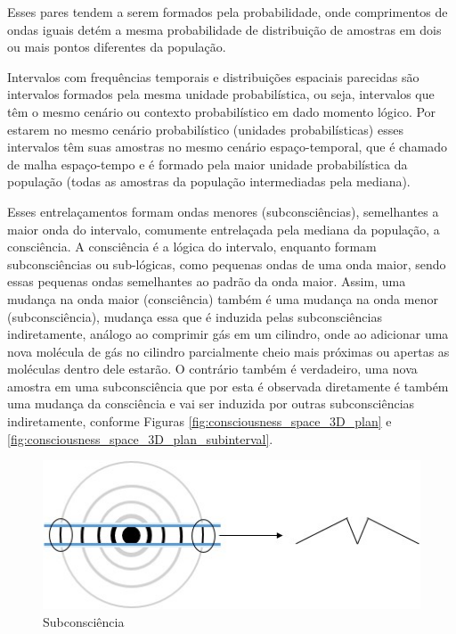 Esses pares tendem a serem formados pela probabilidade, onde comprimentos de ondas iguais detém a mesma probabilidade de distribuição de amostras em dois ou mais pontos diferentes da população. 

Intervalos com frequências temporais e distribuições espaciais parecidas são intervalos formados pela mesma unidade probabilística, ou seja, intervalos que têm o mesmo cenário ou contexto probabilístico em dado momento lógico. Por estarem no mesmo cenário probabilístico (unidades probabilísticas) esses intervalos têm suas amostras no mesmo cenário espaço-temporal, que é chamado de malha espaço-tempo e é formado pela maior unidade probabilística da população (todas as amostras da população intermediadas pela mediana). 

Esses entrelaçamentos formam ondas menores (subconsciências), semelhantes a maior onda do intervalo, comumente entrelaçada pela mediana da população, a consciência. A consciência é a lógica do intervalo, enquanto formam subconsciências ou sub-lógicas, como pequenas ondas de uma onda maior, sendo essas pequenas ondas semelhantes ao padrão da onda maior. Assim, uma mudança na onda maior (consciência) também é uma mudança na onda menor (subconsciência), mudança essa que é induzida pelas subconsciências indiretamente, análogo ao comprimir gás em um cilindro, onde ao adicionar uma nova molécula de gás no cilindro parcialmente cheio mais próximas ou apertas as moléculas dentro dele estarão. O contrário também é verdadeiro, uma nova amostra em uma subconsciência que por esta é observada diretamente é também uma mudança da consciência e vai ser induzida por outras subconsciências indiretamente, conforme Figuras \ref{fig:consciousness_space_3D_plan} e \ref{fig:consciousness_space_3D_plan_subinterval}.
	\begin{figure}[H]
	\caption{Subconsciência}
	\label{fig:consciousness_subconscious}
	\centering
	\includegraphics[scale=.8]{sections/images/consciousness_subconscious.jpg}
	\end{figure}
	
